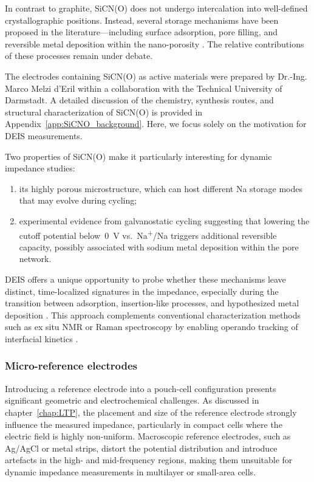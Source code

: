 In contrast to graphite, SiCN(O) does not undergo intercalation into well-defined crystallographic positions.  
Instead, several storage mechanisms have been proposed in the literature—including surface adsorption, pore filling, and reversible metal deposition within the nano-porosity \cite{liuReviewHardCarbon2025}.  
The relative contributions of these processes remain under debate.

The electrodes containing SiCN(O) as active materials were prepared by Dr.-Ing. Marco Melzi d'Eril within a collaboration with the Technical University of Darmstadt.
A detailed discussion of the chemistry, synthesis routes, and structural characterization of SiCN(O) is provided in Appendix~\ref{app:SiCNO_background}.  
Here, we focus solely on the motivation for DEIS measurements.

Two properties of SiCN(O) make it particularly interesting for dynamic impedance studies:
\begin{enumerate}
    \item its highly porous microstructure, which can host different Na storage modes that may evolve during cycling;
    \item experimental evidence from galvanostatic cycling \cite{derilReversibleSodiumPlating2023} suggesting that lowering the cutoff potential below~0~V vs.\ Na\textsuperscript{+}/Na triggers additional reversible capacity, possibly associated with sodium metal deposition within the pore network.
\end{enumerate}

DEIS offers a unique opportunity to probe whether these mechanisms leave distinct, time-localized signatures in the impedance, especially during the transition between adsorption, insertion-like processes, and hypothesized metal deposition \cite{derilReversibleSodiumPlating2023}.  
This approach complements conventional characterization methods such as ex situ NMR or Raman spectroscopy by enabling operando tracking of interfacial kinetics \cite{sicSiCNCeramicsElectrode2022, melziderilUnravelingNaIonInsertion2024}.

\subsubsection{Micro-reference electrodes}

Introducing a reference electrode into a pouch-cell configuration presents significant geometric and electrochemical challenges.  
As discussed in chapter~\ref{chap:LTP}, the placement and size of the reference electrode strongly influence the measured impedance, particularly in compact cells where the electric field is highly non-uniform.  
Macroscopic reference electrodes, such as Ag/AgCl or metal strips, distort the potential distribution and introduce artefacts in the high- and mid-frequency regions, making them unsuitable for dynamic impedance measurements in multilayer or small-area cells.

